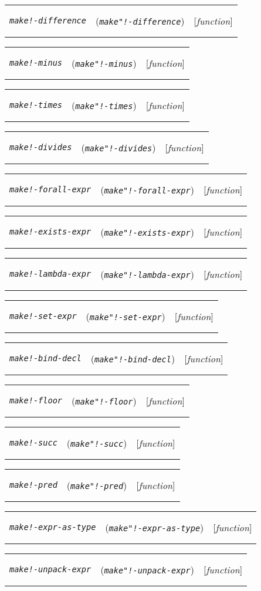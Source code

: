 \documentclass[12pt]{book}
\makeatletter
\def\ampoptional{{\smaller\sc {\smaller\smaller \&}optional\ }}
\newcommand{\functionnm}[1]{\texttt{\textit{#1}}}
\newenvironment{functioni}[3]%
{\par\noindent\begin{boxedminipage}{\textwidth}%
 \par\noindent\begin{tabularx}{\linewidth}{lXr}%
 \hypertarget{#1}{\functionnm{#1}}\index{#2@\functionnm{#2}|underline}%
   &(\texttt{\textit{#2}})&[\emph{function}]%
 \end{tabularx}\par}
{\end{boxedminipage}}
\makeatother
\begin{document}
\begin{functioni}{make!-difference}{make"!-difference}{ex1 ex2}
\end{functioni}

\begin{functioni}{make!-minus}{make"!-minus}{ex}
\end{functioni}

\begin{functioni}{make!-times}{make"!-times}{ex1 ex2}
\end{functioni}

\begin{functioni}{make!-divides}{make"!-divides}{ex1 ex2}
\end{functioni}

\begin{functioni}{make!-forall-expr}{make"!-forall-expr}{bindings expr}
\end{functioni}

\begin{functioni}{make!-exists-expr}{make"!-exists-expr}{bindings expr}
\end{functioni}

\begin{functioni}{make!-lambda-expr}{make"!-lambda-expr}{bindings expr}
\end{functioni}

\begin{functioni}{make!-set-expr}{make"!-set-expr}{bindings expr}
\end{functioni}

\begin{functioni}{make!-bind-decl}{make"!-bind-decl}{id type-expr}
\end{functioni}

\begin{functioni}{make!-floor}{make"!-floor}{ex}
\end{functioni}

\begin{functioni}{make!-succ}{make"!-succ}{ex}
\end{functioni}

\begin{functioni}{make!-pred}{make"!-pred}{ex}
\end{functioni}

\begin{functioni}{make!-expr-as-type}{make"!-expr-as-type}{pred}
\end{functioni}

\begin{functioni}{make!-unpack-expr}{make"!-unpack-expr}{expr selections \ampoptional else-part}
\end{functioni}
\end{document}

